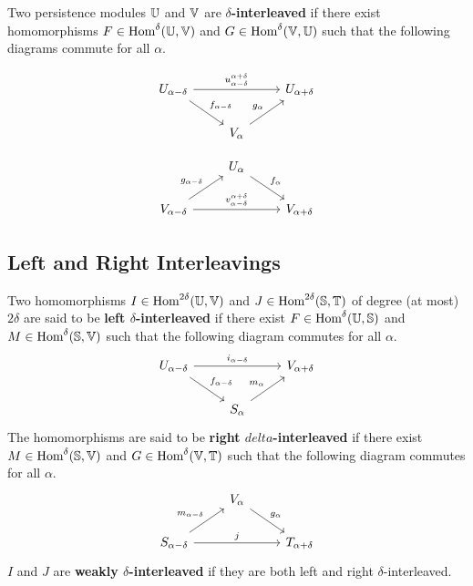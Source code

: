 Two persistence modules $\mathbb{U}$ and $\mathbb{V}$ are \textbf{$\delta$-interleaved} if there exist homomorphisms $F\in\text{Hom}^\delta(\mathbb{U}, \mathbb{V})$ and $G \in\text{Hom}^\delta(\mathbb{V},\mathbb{U})$ such that the following diagrams commute for all $\alpha$.
\begin{minipage}{0.45\textwidth}
\begin{equation}\label{dgm:interleaving1}
  \begin{tikzcd}
    U_{\alpha-\delta}\arrow{rr}{u_{\alpha-\delta}^{\alpha+\delta}}\arrow{dr}{f_{\alpha-\delta}} & &
    U_{\alpha+\delta}\\
    & V_{\alpha}\arrow{ur}{g_\alpha} &
\end{tikzcd}\end{equation}
\end{minipage}
\begin{minipage}{0.45\textwidth}
\begin{equation}\label{dgm:interleaving2}
  \begin{tikzcd}
    & U_{\alpha}\arrow{dr}{f_\alpha} &\\
    V_{\alpha-\delta}\arrow{rr}{v_{\alpha-\delta}^{\alpha+\delta}}\arrow{ur}{g_{\alpha-\delta}} & &
    V_{\alpha+\delta}
\end{tikzcd}\end{equation}
\end{minipage}

\subsection{Left and Right Interleavings}

Two homomorphisms $I\in\text{Hom}^{2\delta}(\mathbb{U},\mathbb{V})$ and $J\in\text{Hom}^{2\delta}(\mathbb{S},\mathbb{T})$ of degree (at most) $2\delta$ are said to be \textbf{left $\delta$-interleaved} if there exist $F\in\text{Hom}^\delta(\mathbb{U},\mathbb{S})$ and $M\in\text{Hom}^\delta(\mathbb{S},\mathbb{V})$ such that the following diagram commutes for all $\alpha$.
\begin{equation}\label{dgm:left_interleaving}
  \begin{tikzcd}
    U_{\alpha-\delta}\arrow{rr}{i_{\alpha-\delta}}\arrow{dr}{f_{\alpha-\delta}} & &
    V_{\alpha+\delta}\\
    & S_{\alpha}\arrow{ur}{m_\alpha} &
\end{tikzcd}\end{equation}
The homomorphisms are said to be \textbf{right $delta$-interleaved} if there exist $M\in\text{Hom}^\delta(\mathbb{S},\mathbb{V})$ and $G\in\text{Hom}^\delta(\mathbb{V},\mathbb{T})$ such that the following diagram commutes for all $\alpha$.
\begin{equation}\label{dgm:right_interleaving}
  \begin{tikzcd}
    & V_{\alpha}\arrow{dr}{g_\alpha} &\\
    S_{\alpha-\delta}\arrow{rr}{j}\arrow{ur}{m_{\alpha-\delta}} & &
    T_{\alpha+\delta}
\end{tikzcd}\end{equation}
$I$ and $J$ are \textbf{weakly $\delta$-interleaved} if they are both left and right $\delta$-interleaved.

